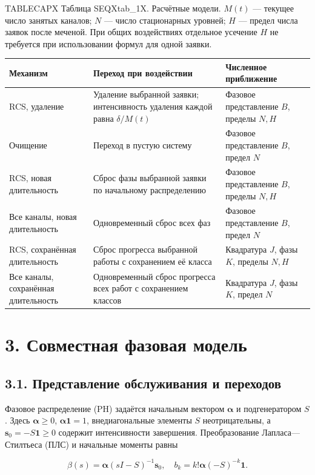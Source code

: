 \noindent TABLECAPX Таблица SEQXtab_1X. Расчётные модели. \(M(t)\) --- текущее число занятых каналов; \(N\) --- число стационарных уровней; \(H\) --- предел числа заявок после меченой. При общих воздействиях отдельное усечение \(H\) не требуется при использовании формул для одной заявки.\par


\begin{tabular}{p{3.6cm}p{6.0cm}p{5.0cm}}
\toprule
Механизм & Переход при воздействии & Численное приближение \\
\midrule
RCS, удаление & Удаление выбранной заявки; интенсивность удаления каждой равна \(\delta/M(t)\) & Фазовое представление \(B\), пределы \(N,H\) \\
Очищение & Переход в пустую систему & Фазовое представление \(B\), предел \(N\) \\
RCS, новая длительность & Сброс фазы выбранной заявки по начальному распределению & Фазовое представление \(B\), пределы \(N,H\) \\
Все каналы, новая длительность & Одновременный сброс всех фаз & Фазовое представление \(B\), предел \(N\) \\
RCS, сохранённая длительность & Сброс прогресса выбранной работы с сохранением её класса & Квадратура \(J\), фазы \(K\), пределы \(N,H\) \\
Все каналы, сохранённая длительность & Одновременный сброс прогресса всех работ с сохранением классов & Квадратура \(J\), фазы \(K\), предел \(N\) \\
\bottomrule
\end{tabular}




\section*{3. Совместная фазовая модель}
\subsection*{3.1. Представление обслуживания и переходов}
Фазовое распределение (PH) задаётся начальным вектором \(\boldsymbol\alpha\) и подгенератором \(S\). Здесь \(\boldsymbol\alpha\ge0\), \(\boldsymbol\alpha\mathbf1=1\), внедиагональные элементы \(S\) неотрицательны, а \(\boldsymbol s_0=-S\mathbf1\ge0\) содержит интенсивности завершения. Преобразование Лапласа—Стилтьеса (ПЛС) и начальные моменты равны


\[\beta(s)=\boldsymbol\alpha(sI-S)^{-1}\boldsymbol s_0,\quad
b_k=k!\boldsymbol\alpha(-S)^{-k}\mathbf1.\]


